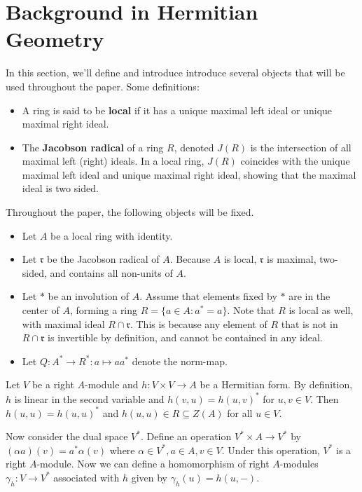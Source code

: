 \section{Background in Hermitian Geometry}
In this section, we'll define and introduce introduce several objects that will be used throughout the paper.
Some definitions:
\begin{itemize}
\item A ring is said to be \textbf{local} if it has a unique maximal left ideal or unique maximal right ideal.
\item The \textbf{Jacobson radical} of a ring $R$, denoted $J(R)$ is the intersection of all maximal left (right) ideals. In a local ring, $J(R)$ coincides with the unique maximal left ideal and unique maximal right ideal, showing that the maximal ideal is two sided.
\end{itemize}

Throughout the paper, the following objects will be fixed.
\begin{itemize}
\item Let $A$ be a local ring with identity.
\item Let $\mathfrak{r}$ be the Jacobson radical of $A$. Because $A$ is local, $\mathfrak{r}$ is maximal, two-sided, and contains all non-units of $A$.
\item Let $*$ be an involution of $A$. Assume that elements fixed by $*$ are in the center of $A$, forming a ring $R = \{a \in A: a^* = a\}$.
Note that $R$ is local as well, with maximal ideal $R \cap \mathfrak{r}$. This is because any element of $R$ that is not in $R \cap \mathfrak{r}$ is invertible by definition, and cannot be contained in any ideal.
\item Let $Q: A^* \to R^*: a \mapsto aa^*$ denote the norm-map.
\end{itemize}

Let $V$ be a right $A$-module and $h: V \times V \to A$ be a Hermitian form.
By definition, $h$ is linear in the second variable and $h(v, u) = h(u, v)^*$ for $u, v \in V$.
Then $h(u,u) = h(u,u)^*$ and $h(u,u) \in R \subseteq Z(A)$ for all $u \in V$.

Now consider the dual space $V^*$. Define an operation $V^* \times A \to V^*$ by $(\alpha a)(v) = a^* \alpha(v)$ where $\alpha \in V^*, a \in A, v \in V$.
Under this operation, $V^*$ is a right $A$-module.
Now we can define a homomorphism of right $A$-modules $\gamma_h: V \to V^*$ associated with $h$ given by $\gamma_h(u) = h(u, -)$.


